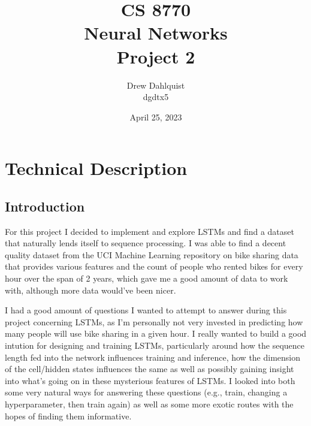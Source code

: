 \documentclass[12pt, twoside]{report}
\begin{document}
\title{CS 8770 \\ Neural Networks \\ Project 2}
\author{Drew Dahlquist \\ dgdtx5}
\date{April 25, 2023}
\maketitle

\tableofcontents



\chapter{Technical Description}

\section{Introduction}

For this project I decided to implement and explore LSTMs and find a dataset that naturally lends itself to 
sequence processing. I was able to find a decent quality dataset from the UCI Machine Learning repository on
bike sharing data that provides various features and the count of people who rented bikes for every hour over the 
span of 2 years, which gave me a good amount of data to work with, although more data would've been nicer.

I had a good amount of questions I wanted to attempt to answer during this project concerning LSTMs, as I'm
personally not very invested in predicting how many people will use bike sharing in a given hour.
I really wanted to build a good intution for designing and training LSTMs, particularly around how the
sequence length fed into the network influences training and inference, how the dimension of the cell/hidden states
influences the same as well as possibly gaining insight into what's going on in these mysterious features of LSTMs.
I looked into both some very natural ways for answering these questions 
(e.g., train, changing a hyperparameter, then train again) as well as some more exotic routes with the hopes
of finding them informative.
\end{document}

